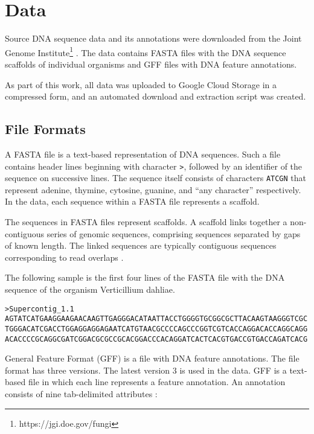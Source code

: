\chapter{\label{ch:data}Data}

\minitoc

Source DNA sequence data and its annotations were downloaded from the Joint
Genome Institute\footnote{https://jgi.doe.gov/fungi}
\cite{grigoriev2014mycocosm}. The data contains FASTA files with the DNA
sequence scaffolds of individual organisms and GFF files with DNA feature
annotations.

As part of this work, all data was uploaded to Google Cloud Storage in a
compressed form, and an automated download and extraction script was created.

\section{\label{ch:data:file-formats}File Formats}

A FASTA file is a text-based representation of DNA sequences. Such a file
contains header lines beginning with character \Verb_>_, followed by an
identifier of the sequence on successive lines. The sequence itself consists of
characters \Verb_ATCGN_ that represent adenine, thymine, cytosine, guanine, and
``any character'' respectively. In the data, each sequence within a FASTA file
represents a scaffold.

The sequences in FASTA files represent scaffolds. A scaffold links together a
non-contiguous series of genomic sequences, comprising sequences separated by
gaps of known length. The linked sequences are typically contiguous sequences
corresponding to read overlaps \cite{ison2013edam}.

The following sample is the first four lines of the FASTA file with the DNA
sequence of the organism Verticillium dahliae.

\begin{Verbatim}[fontsize=\small]
>Supercontig_1.1
AGTATCATGAAGGAAGAACAAGTTGAGGGACATAATTACCTGGGGTGCGGCGCTTACAAGTAAGGGTCGC
TGGGACATCGACCTGGAGGAGGAGAATCATGTAACGCCCCAGCCCGGTCGTCACCAGGACACCAGGCAGG
ACACCCCGCAGGCGATCGGACGCGCCGCACGGACCCACAGGATCACTCACGTGACCGTGACCAGATCACG
\end{Verbatim}

General Feature Format (GFF) is a file with DNA feature annotations. The file
format has three versions. The latest version 3 is used in the data. GFF is a
text-based file in which each line represents a feature annotation. An
annotation consists of nine tab-delimited attributes \cite{gff}:

